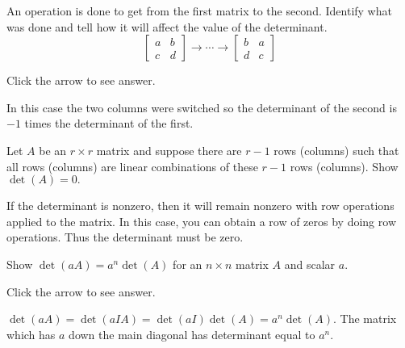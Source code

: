 \documentclass{ximera}
\begin{document}
\begin{problem}\label{prb:7.13} An operation is done to get from the first matrix to the second.
Identify what was done and tell how it will affect the value of the
determinant.
\begin{equation*}
\left[
\begin{array}{cc}
a & b \\
c & d
\end{array}
\right] \rightarrow \cdots \rightarrow \left[
\begin{array}{cc}
b & a \\
d & c
\end{array}
\right]
\end{equation*}

Click the arrow to see answer.
\begin{expandable}
In this case the two columns were switched so the determinant of the second
is $-1$ times the determinant of the first.
\end{expandable}
\end{problem}


\begin{problem}\label{prb:7.14} Let $A$ be an $r\times r$ matrix and suppose there are $r-1$ rows
(columns) such that all rows (columns) are linear combinations of these $r-1$
rows (columns). Show $\det \left( A\right) =0.$

\begin{hint}
If the determinant is nonzero, then it will remain nonzero with row operations applied to the matrix.
In this case, you can obtain a row of zeros by doing row
operations. Thus the determinant must be zero.
\end{hint}
\end{problem}

\begin{problem}\label{prb:7.15} Show $\det \left( aA\right) =a^{n}\det \left( A\right) $ for an $n \times n $ matrix $A
$ and scalar $a$.

Click the arrow to see answer.
\begin{expandable}
$\det \left( aA\right) =\det
\left( aIA\right) =\det \left( aI\right) \det \left( A\right) =a^{n}\det
\left( A\right) .$ The matrix which has $a$ down the main diagonal has
determinant equal to $a^{n}$.
\end{expandable}
\end{problem}
\end{document}
